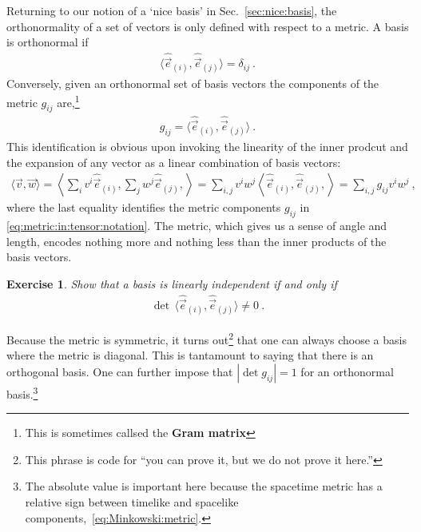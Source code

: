 \documentclass[
  11pt,
	colorful,
	raggedright,
]{tufte-style-thesis-flip}
\newtheorem{exercise}{Exercise}[section]
\begin{document}
Returning to our notion of a `nice basis' in Sec.~\ref{sec:nice:basis}, the orthonormality of a set of vectors is only defined with respect to a metric. A basis is orthonormal if
\begin{align}
  \langle \hat{\vec{e}}_{(i)}, \hat{\vec{e}}_{(j)} \rangle
  = \delta_{ij} 
  \ .
\end{align}
Conversely, given an orthonormal set of basis vectors the components of the metric $g_{ij}$ are,\footnote{This is sometimes callsed the \textbf{Gram matrix}} 
\begin{align}
  g_{ij} = \langle \hat{\vec{e}}_{(i)}, \hat{\vec{e}}_{(j)} \rangle \ .
\end{align}
This identification is obvious upon invoking the linearity of the inner prodcut and the expansion of any vector as a linear combination of basis vectors:
\begin{align}
  \langle \vec v, \vec w \rangle = 
  \left\langle
    \sum_i v^i \hat{\vec{e}}_{(i)},
    \sum_j w^j \hat{\vec{e}}_{(j)},
  \right\rangle
  =
  \sum_{i,j}
  v^iw^j\left\langle
     \hat{\vec{e}}_{(i)},
    \hat{\vec{e}}_{(j)},
  \right\rangle
  = 
  \sum_{i,j}
  g_{ij}v^iw^j
   \ ,
\end{align}
where the last equality identifies the metric components $g_{ij}$ in \eqref{eq:metric:in:tensor:notation}. The metric, which gives us a sense of angle and length, encodes nothing more and nothing less than the inner products of the basis vectors.

\begin{exercise}
Show that a basis is linearly independent if and only if
\begin{align}
\det\,\langle \hat{\vec{e}}_{(i)}, \hat{\vec{e}}_{(j)} \rangle \neq 0 \ .  
\end{align}
\end{exercise}
Because the metric is symmetric, it turns out\footnote{This phrase is code for ``you can prove it, but we do not prove it here.''} that one can always choose a basis where the metric is diagonal. This is tantamount to saying that there is an orthogonal basis. One can further impose that $|\det g_{ij}| = 1$ for an orthonormal basis.\footnote{The absolute value is important here because the  spacetime metric has a relative sign between timelike and spacelike components,~\eqref{eq:Minkowski:metric}.}
\end{document}
